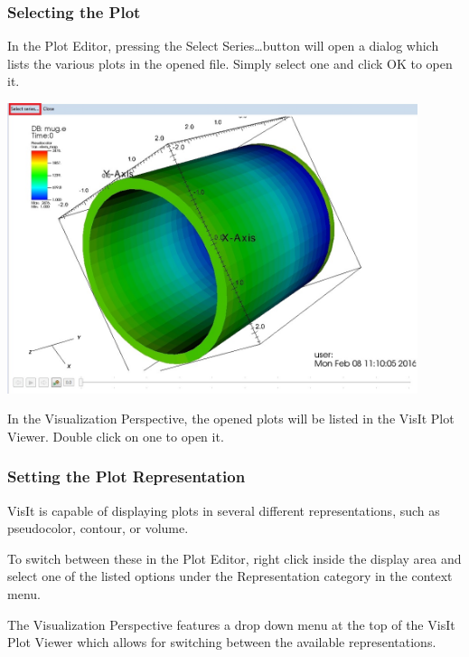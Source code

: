 \documentclass{article}
\begin{document}
\subsubsection{Selecting the Plot}

In the Plot Editor, pressing the Select Series\ldots button will open a dialog
which lists the various plots in the opened file. Simply select one and click OK
to open it. 

\begin{center}
\includegraphics[width=12cm]{images/PlotEditorSelectSeriesButton}
\end{center}

In the Visualization Perspective, the opened plots will be listed in the VisIt
Plot Viewer. Double click on one to open it.

\subsubsection{Setting the Plot Representation}

VisIt is capable of displaying plots in several different representations, such
as pseudocolor, contour, or volume.

To switch between these in the Plot Editor, right click inside the display area
and select one of the listed options under the Representation category in the
context menu.

The Visualization Perspective features a drop down menu at the top of the VisIt
Plot Viewer which allows for switching between the available representations. 
\end{document}
